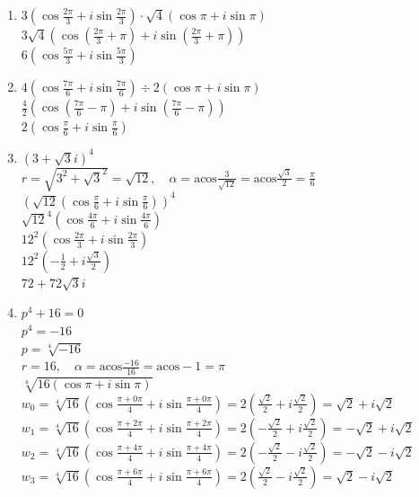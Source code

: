 \documentclass[11pt, a4paper]{article}
\newcommand{\acos}{\mathrm{acos}}
\begin{document}
\begin{enumerate}
	\item $3 \left( \cos \frac{2\pi}{3} + i \sin \frac{2\pi}{3} \right) \cdot \sqrt{4} \left( \cos \pi + i \sin \pi \right)$ \\
		$3 \sqrt{4} \left( \cos \left( \frac{2\pi}{3}+\pi \right) + i \sin \left( \frac{2\pi}{3} + \pi \right) \right)$ \\
		$6 \left( \cos \frac{5\pi}{3} + i \sin \frac{5\pi}{3} \right)$
	\item $4 \left( \cos \frac{7\pi}{6} + i \sin \frac{7\pi}{6} \right) \div 2 \left( \cos \pi + i \sin \pi \right)$ \\
		$\frac{4}{2} \left( \cos \left( \frac{7\pi}{6} - \pi \right) + i \sin \left( \frac{7\pi}{6} - \pi \right) \right)$ \\
		$2 \left( \cos \frac{\pi}{6} + i \sin \frac{\pi}{6} \right)$
	\item $\left( 3+\sqrt{3}i \right)^4$ \\
		$r = \sqrt{3^2 + \sqrt{3}^2} = \sqrt{12}, \quad \alpha = \acos \frac{3}{\sqrt{12}} = \acos \frac{\sqrt{3}}{2} = \frac{\pi}{6}$ \\
		$\left( \sqrt{12} \left( \cos \frac{\pi}{6} + i \sin \frac{\pi}{6} \right) \right)^4$ \\
		$\sqrt{12}^4 \left( \cos \frac{4\pi}{6} + i \sin \frac{4\pi}{6} \right)$ \\
		$12^2 \left( \cos \frac{2\pi}{3} + i \sin \frac{2\pi}{3} \right)$ \\
		$12^2 \left( - \frac{1}{2} + i \frac{\sqrt{3}}{2} \right)$ \\
		$72 + 72\sqrt{3}i$
	\item $p^4 + 16 = 0$ \\
		$p^4 = -16$ \\
		$p = \sqrt[4]{-16}$ \\
		$r=16, \quad \alpha = \acos \frac{-16}{16} = \acos -1 = \pi$ \\
		$\sqrt[4]{16 (\cos \pi + i \sin \pi)}$ \\
		$w_0 = \sqrt[4]{16} \left(\cos \frac{\pi + 0\pi}{4} + i \sin \frac{\pi + 0\pi}{4} \right) = 2 \left( \frac{\sqrt{2}}{2} + i \frac{\sqrt{2}}{2} \right) = \sqrt{2} + i \sqrt{2}$ \\
		$w_1 = \sqrt[4]{16} \left(\cos \frac{\pi + 2\pi}{4} + i \sin \frac{\pi + 2\pi}{4} \right) = 2 \left( -\frac{\sqrt{2}}{2} + i \frac{\sqrt{2}}{2} \right) = -\sqrt{2} + i \sqrt{2}$ \\
		$w_2 = \sqrt[4]{16} \left(\cos \frac{\pi + 4\pi}{4} + i \sin \frac{\pi + 4\pi}{4} \right) = 2 \left( -\frac{\sqrt{2}}{2} - i \frac{\sqrt{2}}{2} \right) = -\sqrt{2} - i \sqrt{2}$ \\
		$w_3 = \sqrt[4]{16} \left(\cos \frac{\pi + 6\pi}{4} + i \sin \frac{\pi + 6\pi}{4} \right) = 2 \left( \frac{\sqrt{2}}{2} - i \frac{\sqrt{2}}{2} \right) = \sqrt{2} - i \sqrt{2}$ \\
\end{enumerate}
\end{document}
